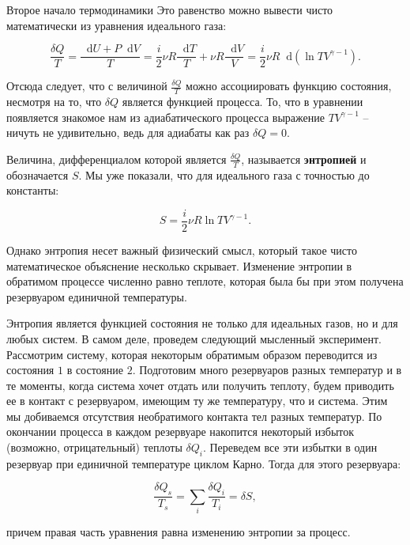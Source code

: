 \documentclass{article}
\renewcommand{\d}{\mathop{}\!\mathrm{d}}
\begin{document}
\begin{section}{Второе начало термодинамики}
		Это равенство можно вывести чисто математически из уравнения идеального газа:

		\begin{equation*}
			\frac{\delta Q}{T} = \frac{\d U + P \d V}{T} = \frac{i}{2} \nu R \frac{\d T}{T} + \nu R \frac{\d V}{V} = \frac{i}{2} \nu R \d \left( \ln TV^{\gamma - 1} \right).
		\end{equation*}

		Отсюда следует, что с величиной $\frac{\delta Q}{T}$ можно ассоциировать функцию состояния, несмотря на то, что $\delta Q$ является функцией процесса. То, что в уравнении появляется знакомое нам из адиабатического процесса выражение $TV^{\gamma - 1}$ -- ничуть не удивительно, ведь для адиабаты как раз $\delta Q = 0$.

		Величина, дифференциалом которой является $\frac{\delta Q}{T}$, называется \textbf{энтропией} и обозначается $S$. Мы уже показали, что для идеального газа с точностью до константы:

		\begin{equation*}
			S = \frac{i}{2} \nu R \ln T V^{\gamma - 1}.
		\end{equation*}

		Однако энтропия несет важный физический смысл, который такое чисто математическое объяснение несколько скрывает. Изменение энтропии в обратимом процессе численно равно теплоте, которая была бы при этом получена резервуаром единичной температуры.

		Энтропия является функцией состояния не только для идеальных газов, но и для любых систем. В самом деле, проведем следующий мысленный эксперимент. Рассмотрим систему, которая некоторым обратимым образом переводится из состояния $1$ в состояние $2$. Подготовим много резервуаров разных температур и в те моменты, когда система хочет отдать или получить теплоту, будем приводить ее в контакт с резервуаром, имеющим ту же температуру, что и система. Этим мы добиваемся отсутствия необратимого контакта тел разных температур. По окончании процесса в каждом резервуаре накопится некоторый избыток (возможно, отрицательный) теплоты $\delta Q_i$. Переведем все эти избытки в один резервуар при единичной температуре циклом Карно. Тогда для этого резервуара:

		\begin{equation*}
			\frac{\delta Q_s}{T_s} = \sum_i \frac{\delta Q_i}{T_i} = \delta S,
		\end{equation*}

		причем правая часть уравнения равна изменению энтропии за процесс.


\end{section}
\end{document}
